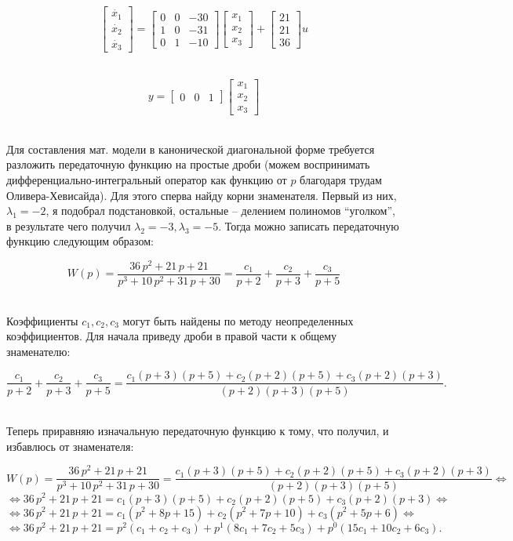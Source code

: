 \documentclass[a4paper]{article}
\begin{document}
$$
\begin{bmatrix}
    \dot{x_1} \\
    \dot{x_2} \\
    \dot{x_3}
\end{bmatrix} = \begin{bmatrix}
    0 & 0 & -30 \\ 
    1 & 0 & -31 \\
    0 & 1 & -10
\end{bmatrix}\begin{bmatrix}
    x_1 \\
    x_2 \\
    x_3
\end{bmatrix} + \begin{bmatrix}
    21 \\ 
    21 \\ 
    36
\end{bmatrix}u
$$\

$$
y = \begin{bmatrix}
    0 & 0 & 1
\end{bmatrix}\begin{bmatrix}
    x_1 \\
    x_2 \\
    x_3
\end{bmatrix}
$$\

Для составления мат. модели в канонической диагональной форме требуется разложить передаточную функцию на простые дроби (можем воспринимать дифференциально-интегральный оператор как функцию от $p$ благодаря трудам Оливера-Хевисайда). Для этого сперва найду корни знаменателя. Первый из них, $\lambda_1 = -2$, я подобрал подстановкой, остальные -- делением полиномов ``уголком'', в результате чего получил $\lambda_2 = -3, \lambda_3 = -5$. Тогда можно записать передаточную функцию следующим образом:

$$
W(p) = \frac{36\,p^2 + 21\,p + 21}{p^3+10\,p^2+31\,p + 30} = \frac{c_1}{p+2} + \frac{c_2}{p+3} + \frac{c_3}{p+5}
$$\ 

Коэффициенты $c_1, c_2, c_3$ могут быть найдены по методу неопределенных коэффициентов. Для начала приведу дроби в правой части к общему знаменателю:

$$
\frac{c_1}{p+2} + \frac{c_2}{p+3} + \frac{c_3}{p+5} = \frac{c_1(p+3)(p+5) + c_2(p+2)(p+5) + c_3(p+2)(p+3)}{(p+2)(p+3)(p+5)}.
$$\ 

Теперь приравняю изначальную передаточную функцию к тому, что получил, и избавлюсь от знаменателя:

$$
W(p) = \frac{36\,p^2 + 21\,p + 21}{p^3+10\,p^2+31\,p + 30} = \frac{c_1(p+3)(p+5) + c_2(p+2)(p+5) + c_3(p+2)(p+3)}{(p+2)(p+3)(p+5)} \Leftrightarrow
$$
$$
\Leftrightarrow 36\,p^2 + 21\,p + 21 = c_1(p+3)(p+5) + c_2(p+2)(p+5) + c_3(p+2)(p+3) \Leftrightarrow
$$
$$
\Leftrightarrow 36\,p^2 + 21\,p + 21 = c_1(p^2+8p+15) + c_2(p^2+7p+10) + c_3(p^2+5p+6)\Leftrightarrow
$$
$$
\Leftrightarrow 36\,p^2 + 21\,p + 21 = p^2(c_1+c_2+c_3) + p^1(8c_1+7c_2+5c_3)+p^0(15c_1+10c_2+6c_3).
$$\ 
\end{document}
